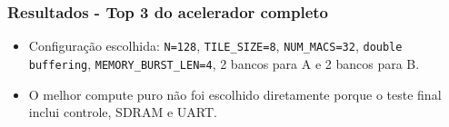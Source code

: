 \documentclass{beamer}
\begin{document}
\begin{frame}
\frametitle{Resultados - Top 3 do acelerador completo}

\begin{table}
\centering
\tiny
\caption{Melhores configurações do sweep com SDRAM/top completo. A linha verde indica a configuração escolhida para teste na placa.}
\end{table}

\vspace{0.1cm}
\begin{itemize}
    \item Configuração escolhida: \texttt{N=128}, \texttt{TILE\_SIZE=8}, \texttt{NUM\_MACS=32}, \texttt{double buffering}, \texttt{MEMORY\_BURST\_LEN=4}, 2 bancos para A e 2 bancos para B.
    \item O melhor compute puro não foi escolhido diretamente porque o teste final inclui controle, SDRAM e UART.
\end{itemize}

\end{frame}
\end{document}
